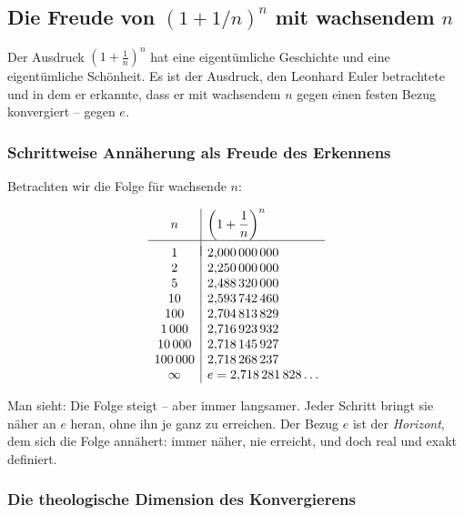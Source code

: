 ﻿\documentclass[a4paper,12pt]{article}
\theoremstyle{definition}
\begin{document}
\subsection{Die Freude von $(1 + 1/n)^n$ mit wachsendem $n$}

Der Ausdruck $\left(1 + \frac{1}{n}\right)^n$ hat eine eigentümliche Geschichte
und eine eigentümliche Schönheit. Es ist der Ausdruck, den Leonhard Euler betrachtete
und in dem er erkannte, dass er mit wachsendem $n$ gegen einen festen Bezug
konvergiert -- gegen $e$.

\subsubsection{Schrittweise Annäherung als Freude des Erkennens}

Betrachten wir die Folge für wachsende $n$:

\begin{equation}
	\begin{array}{c|l}
		n & \left(1 + \dfrac{1}{n}\right)^n \\[6pt]
		\hline\\[-8pt]
		1   & 2{,}000\,000\,000 \\
		2   & 2{,}250\,000\,000 \\
		5   & 2{,}488\,320\,000 \\
		10  & 2{,}593\,742\,460 \\
		100 & 2{,}704\,813\,829 \\
		1\,000   & 2{,}716\,923\,932 \\
		10\,000  & 2{,}718\,145\,927 \\
		100\,000 & 2{,}718\,268\,237 \\
		\infty   & e = 2{,}718\,281\,828\ldots
	\end{array}
\end{equation}

Man sieht: Die Folge steigt -- aber immer langsamer. Jeder Schritt bringt sie
näher an $e$ heran, ohne ihn je ganz zu erreichen. Der Bezug $e$ ist der
\textit{Horizont}, dem sich die Folge annähert: immer näher, nie erreicht,
und doch real und exakt definiert.

\subsubsection{Die theologische Dimension des Konvergierens}
\end{document}
